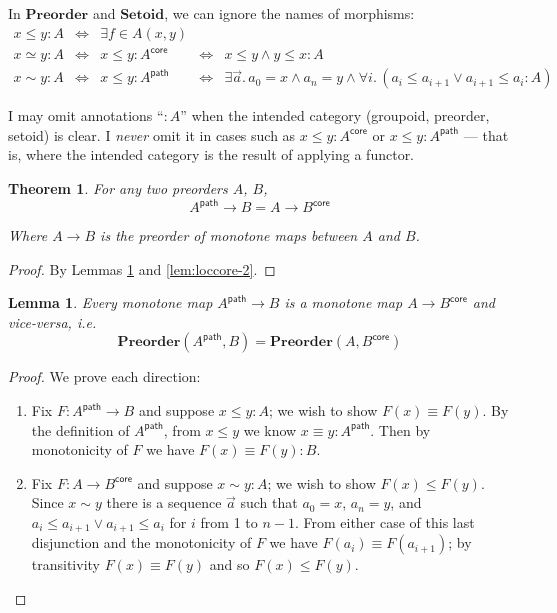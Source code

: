 \documentclass{article}
\newtheorem{theorem}{Theorem}
\newtheorem{lemma}{Lemma}
\newcommand{\ms}[1]{\ensuremath{\mathsf{#1}}}
\newcommand{\mb}[1]{\ensuremath{\mathbf{#1}}}
\newcommand{\binder}{.\,}
\newcommand{\bind}[1]{{#1}\binder}
\newcommand{\iso}{\ms{core}}
\renewcommand{\path}{\ms{path}}
\newcommand{\isoto}{\simeq}
\newcommand{\pathto}{\sim}
\begin{document}
In $\mb{Preorder}$ and $\mb{Setoid}$, we can ignore the names of morphisms:
\[\begin{array}{lclcl}
  x \le y : A &\iff& \exists f \in A(x,y)\\
  x \isoto y : A &\iff& x \le y : A^\iso &\iff& x \le y \wedge y \le x : A\\
  x \pathto y : A &\iff& x \le y : A^\path
  &\iff& \exists\bind{\vec{a}} a_0 = x \wedge a_n = y
  \wedge \forall\bind{i} (a_i \le a_{i+1} \vee a_{i+1} \le a_i : A)
\end{array}\]

I may omit annotations ``$: A$'' when the intended category (groupoid, preorder,
setoid) is clear. I \emph{never} omit it in cases such as $x \le y : A^\iso$ or
$x \le y : A^\path$ --- that is, where the intended category is the result of
applying a functor.

\begin{theorem}\label{thm:loccore} For any two preorders $A$, $B$,
  \begin{equation}
    A^\path \to B = A \to B^\iso
  \end{equation}

  Where $A \to B$ is the preorder of monotone maps between $A$ and $B$.
\end{theorem}

\begin{proof} By Lemmas \ref{lem:loccore-1} and \ref{lem:loccore-2}.
\end{proof}

\begin{lemma}\label{lem:loccore-1}
  Every monotone map $A^\path \to B$ is a monotone map $A \to B^\iso$ and
  vice-versa, i.e.
  \[ \mb{Preorder}(A^\path, B) = \mb{Preorder}(A, B^\iso) \]
\end{lemma}

\begin{proof} We prove each direction:
  \begin{enumerate}
  \item Fix $F : A^\path \to B$ and suppose $x \le y : A$; we wish to show $F(x)
    \equiv F(y)$. By the definition of $A^\path$, from $x \le y$ we know $x
    \equiv y : A^\path$. Then by monotonicity of $F$ we have $F(x) \equiv F(y) :
    B$.

  \item Fix $F : A \to B^\iso$ and suppose $x \pathto y : A$; we wish to show
    $F(x) \le F(y)$. Since $x \pathto y$ there is a sequence $\vec{a}$ such that
    $a_0 = x$, $a_n = y$, and $a_i \le a_{i+1} \vee a_{i+1} \le a_i$ for $i$
    from 1 to $n-1$. From either case of this last disjunction and the
    monotonicity of $F$ we have $F(a_i) \equiv F(a_{i+1})$; by transitivity
    $F(x) \equiv F(y)$ and so $F(x) \le F(y)$.
  \end{enumerate}
\end{proof}
\end{document}
